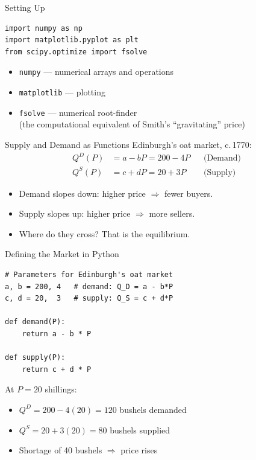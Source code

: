 \documentclass[aspectratio=169, 10pt]{beamer}
\begin{document}
\begin{frame}[fragile]{Setting Up}
\begin{lstlisting}
import numpy as np
import matplotlib.pyplot as plt
from scipy.optimize import fsolve
\end{lstlisting}
\vspace{0.5em}
\begin{itemize}
  \item \texttt{numpy} --- numerical arrays and operations
  \item \texttt{matplotlib} --- plotting
  \item \texttt{fsolve} --- numerical root-finder\\
        (the computational equivalent of Smith's ``gravitating'' price)
\end{itemize}
\end{frame}

\begin{frame}{Supply and Demand as Functions}
Edinburgh's oat market, c.\,1770:
\vspace{0.5em}
\begin{align*}
  Q^D(P) &= a - bP = 200 - 4P  & &\text{(Demand)} \\[4pt]
  Q^S(P) &= c + dP = 20 + 3P   & &\text{(Supply)}
\end{align*}
\vspace{0.3em}
\begin{itemize}
  \item Demand slopes down: higher price $\Rightarrow$ fewer buyers.
  \item Supply slopes up: higher price $\Rightarrow$ more sellers.
  \item Where do they cross? That is the equilibrium.
\end{itemize}
\end{frame}

\begin{frame}[fragile]{Defining the Market in Python}
\begin{lstlisting}
# Parameters for Edinburgh's oat market
a, b = 200, 4   # demand: Q_D = a - b*P
c, d = 20,  3   # supply: Q_S = c + d*P

def demand(P):
    return a - b * P

def supply(P):
    return c + d * P
\end{lstlisting}
\vspace{0.5em}
At $P = 20$ shillings:
\begin{itemize}
  \item $Q^D = 200 - 4(20) = 120$ bushels demanded
  \item $Q^S = 20 + 3(20) = 80$ bushels supplied
  \item \alert{Shortage} of 40 bushels $\Rightarrow$ price rises
\end{itemize}
\end{frame}
\end{document}

